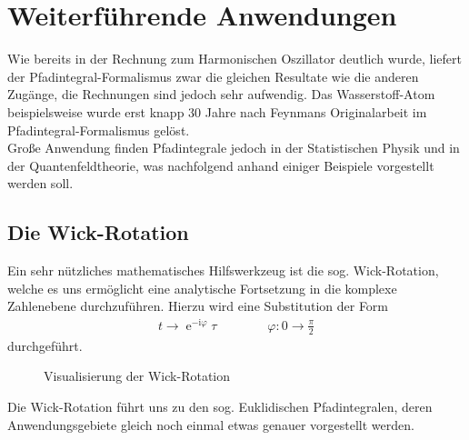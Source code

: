 \section{Weiterführende Anwendungen}
Wie bereits in der Rechnung zum Harmonischen Oszillator deutlich wurde, liefert der Pfadintegral-Formalismus zwar die gleichen Resultate wie die anderen Zugänge, die Rechnungen sind jedoch sehr aufwendig. Das Wasserstoff-Atom beispielsweise wurde erst knapp 30 Jahre nach Feynmans Originalarbeit im Pfadintegral-Formalismus gelöst. \\
Große Anwendung finden Pfadintegrale jedoch in der Statistischen Physik und in der Quantenfeldtheorie, was nachfolgend anhand einiger Beispiele vorgestellt werden soll.
\subsection{Die Wick-Rotation}
Ein sehr nützliches mathematisches Hilfswerkzeug  ist die sog. Wick-Rotation, welche  es uns ermöglicht eine analytische Fortsetzung in die komplexe Zahlenebene durchzuführen. Hierzu wird eine Substitution der Form
\begin{align}
	t \longrightarrow \operatorname{e}^{-\mathrm{i}\varphi}\tau \qquad\qquad \varphi: 0 \rightarrow \frac{\pi}{2}
\end{align}
durchgeführt. 

\begin{figure}[H]
\centering
{}
\caption{Visualisierung der Wick-Rotation}
\end{figure} 	
Die Wick-Rotation führt uns zu den sog. Euklidischen Pfadintegralen, deren Anwendungsgebiete gleich noch einmal etwas genauer vorgestellt werden.

